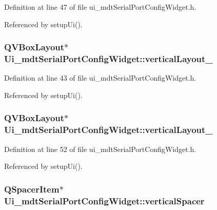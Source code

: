 Definition at line 47 of file ui\-\_\-mdt\-Serial\-Port\-Config\-Widget.\-h.



Referenced by setup\-Ui().

\hypertarget{class_ui__mdt_serial_port_config_widget_a61658b3c6fe1c0287920435b9995f1fd}{
\subsubsection[{vertical\-Layout\-\_\-3}]{\setlength{\rightskip}{0pt plus 5cm}Q\-V\-Box\-Layout$\ast$ Ui\-\_\-mdt\-Serial\-Port\-Config\-Widget\-::vertical\-Layout\-\_}}\label{class_ui__mdt_serial_port_config_widget_a61658b3c6fe1c0287920435b9995f1fd}


Definition at line 43 of file ui\-\_\-mdt\-Serial\-Port\-Config\-Widget.\-h.



Referenced by setup\-Ui().

\hypertarget{class_ui__mdt_serial_port_config_widget_a76228b345ecdb5f7e7e2ce6481c6ceb3}{
\subsubsection[{vertical\-Layout\-\_\-4}]{\setlength{\rightskip}{0pt plus 5cm}Q\-V\-Box\-Layout$\ast$ Ui\-\_\-mdt\-Serial\-Port\-Config\-Widget\-::vertical\-Layout\-\_}}\label{class_ui__mdt_serial_port_config_widget_a76228b345ecdb5f7e7e2ce6481c6ceb3}


Definition at line 52 of file ui\-\_\-mdt\-Serial\-Port\-Config\-Widget.\-h.



Referenced by setup\-Ui().

\hypertarget{class_ui__mdt_serial_port_config_widget_a8f344fc14811cf144465a9185c865490}{
\subsubsection[{vertical\-Spacer}]{\setlength{\rightskip}{0pt plus 5cm}Q\-Spacer\-Item$\ast$ Ui\-\_\-mdt\-Serial\-Port\-Config\-Widget\-::vertical\-Spacer}}\label{class_ui__mdt_serial_port_config_widget_a8f344fc14811cf144465a9185c865490}


